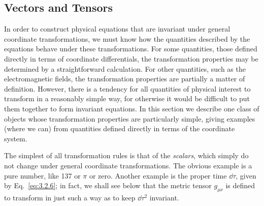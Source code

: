 
\subsection{Vectors and Tensors}\label{sec:4.2}

In order to construct physical equations that are invariant under general
coordinate transformations, we must know how the quantities described by the
equations behave under these transformations. For some quantities, those
defined directly in terms of coordinate differentials, the transformation
properties may be determined by a straightforward calculation. For other
quantities, such as the electromagnetic fields, the transformation properties
are partially a matter of definition. However, there is a tendency for all
quantities of physical interest to transform in a reasonably simple way, for
otherwise it would be difficult to put them together to form invariant
equations. In this section we describe one class of objects whose
transformation properties are particularly simple, giving examples (where we
can) from quantities defined directly in terms of the coordinate system.

The simplest of all transformation rules is that of the \textit{scalars},
which simply do not change under general coordinate transformations. The
obvious example is a pure number, like 137 or \(\pi\) or zero. Another example
is the proper time \(\dd\tau\), given by Eq.~\eqref{eq:3.2.6}; in fact, we
shall see below that the metric tensor \(g_{\mu\nu}\) is defined to transform
in just such a way as to keep \(\dd\tau^2\) invariant.

